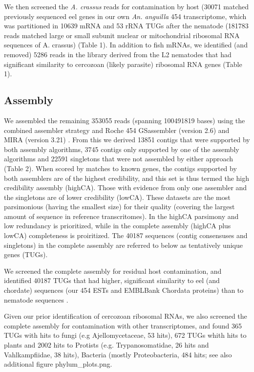 \documentclass[10pt]{bmc_article}
\newenvironment{bmcformat}{\begin{raggedright}\baselineskip20pt\sloppy\setboolean{publ}{false}}{\end{raggedright}\baselineskip20pt\sloppy}
\begin{document}
\begin{bmcformat}
We then screened the \textit{A. crassus} reads for contamination by
host (30071 matched previously
sequenced eel genes in our own \textit{An. anguilla} 454
transcriptome, which was partitioned in 10639
mRNA and 53 rRNA TUGs after
the nematode (181783 reads matched large
or small subunit nuclear or mitochondrial ribosomal RNA sequences of
A. crassus) (Table 1). In addition to fish mRNAs, we identified (and
removed) 5286 reads in the
library derived from the L2 nematodes that had significant similarity
to cercozoan (likely parasite) ribosomal RNA genes (Table 1).

\subsection*{Assembly}



We assembled the remaining 353055 reads (spanning
100491819 bases) using the combined assembler strategy
\cite{pmid20950480} and Roche 454 GSassembler (version 2.6) and MIRA
(version 3.21) \cite{miraEST}. From this we derived 13851
contigs that were supported by both assembly algorithms,
3745 contigs only supported by one of the assembly
algorithms and 22591 singletons that were not assembled by
either approach (Table 2). When scored by matches to known genes, the
contigs supported by both assemblers are of the highest credibility,
and this set is thus termed the high credibility assembly
(highCA). Those with evidence from only one assembler and the
singletons are of lower credibility (lowCA). These datasets are the
most parsimonious (having the smallest size) for their quality
(covering the largest amount of sequence in reference
transcritomes). In the highCA parsimony and low redundancy is
prioritized, while in the complete assembly (highCA plus lowCA)
completeness is proiritized. The 40187 sequences (contig consensuses
and singletons) in the complete assembly are referred to below as
tentatively unique genes (TUGs).




We screened the complete assembly for residual host contamination, and
identified
40187
  TUGs that had higher, significant similarity to eel (and chordate)
  sequences (our 454 ESTs and EMBLBank Chordata proteins) than to
  nematode sequences \cite{pmid21550347}.

  Given our prior identification of cercozoan ribosomal RNAs, we also
  screened the complete assembly for contamination with other
  transcriptomes, and found 365 TUGs with hits
  to fungi (e.g Ajellomycetaceae, 53 hits),
  672 TUGs whith hits to plants and
  2002 hits to Protists (e.g. Trypanosomatidae,
  26 hits and Vahlkampfiidae, 38 hits), Bacteria (mostly
  Proteobacteria, 484 hits; see also additional figure
  phylum\_plots.png.


\end{bmcformat}
\end{document}
